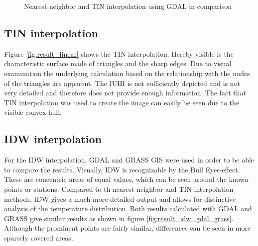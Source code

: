 \begin{figure}
	\centering
	\hfill
	\caption{Nearest neighbor and TIN interpolation using GDAL in comparison}
	\label{fig:result_nearest_linear}
\end{figure}


\subsection{TIN interpolation}

Figure \ref{fig:result_linear} shows the TIN interpolation. Hereby visible is the characteristic surface made of triangles and the sharp edges. Due to visual examination the underlying calculation based on the relationship with the nodes of the triangles are apparent. The IUHI is not sufficiently depicted and is not very detailed and therefore does not provide enough information. The fact that TIN interpolation was used to create the image can easily be seen due to the visible convex hull.


\subsection{IDW interpolation}

For the IDW interpolation, GDAL and GRASS GIS were used in order to be able to compare the results. Visually, IDW is recognizable by the \ldq{}Bull Eyes\rdq{}-effect. These are concentric areas of equal values, which ​can be seen around the known points or stations. Compared to th nearest neighbor and TIN interpolation methods, IDW gives a much more detailed output and allows for distinctive analysis of the temperature distribution. Both results calculated with GDAL and GRASS give similar results as shown in figure \ref{fig:result_idw_gdal_grass}. Although the prominent points are fairly similar, differences can be seen in more sparsely covered areas.

